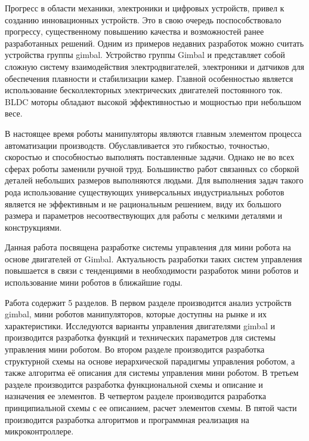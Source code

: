 

Прогресс в области механики, электроники и цифровых устройств, привел к созданию инновационных устройств. Это в свою очередь поспособствовало прогрессу, существенному повышению качества и возможностей ранее разработанных решений. Одним из примеров недавних разработок можно считать устройства группы gimbal. Устройство группы Gimbal и представляет собой сложную систему взаимодействия электродвигателей, электроники и датчиков для обеспечения плавности и стабилизации камер. Главной особенностью является использование бесколлекторных электрических двигателей постоянного ток. BLDC моторы обладают высокой эффективностью и мощностью при небольшом весе. 

В настоящее время роботы манипуляторы являются главным элементом процесса автоматизации производств. Обуславливается это гибкостью, точностью, скоростью и способностью выполнять поставленные задачи. Однако не во всех сферах роботы заменили ручной труд. Большинство работ связанных со сборкой деталей небольших размеров выполняются людьми. Для выполнения задач такого рода использование существующих универсальных индустриальных роботов является не эффективным и не рациональным решением, виду их большого размера и параметров несоотвествующих для работы с мелкими деталями и конструкциями.

Данная работа посвящена разработке системы управления для мини робота на основе двигателей от Gimbal. Актуальность разработки таких систем управления повышается в связи с тенденциями в необходимости разработок мини роботов и использование мини роботов в ближайшие годы.

Работа содержит 5 разделов. В первом разделе производится анализ устройств gimbal, мини роботов манипуляторов, которые доступны на рынке и их характеристики. Исследуются варианты управления двигателями gimbal и производится разработка функций и технических параметров для системы управления мини роботом.  Во втором разделе производится разработка структурной схемы на основе иерархической парадигмы управления роботом, а также алгоритма её описания для системы управления мини роботом. В третьем разделе производится разработка функциональной схемы и описание и назначения ее элементов. В четвертом разделе производится разработка принципиальной схемы с ее описанием, расчет элементов схемы. В пятой части производится разработка алгоритмов и программная реализация на микроконтроллере. 
